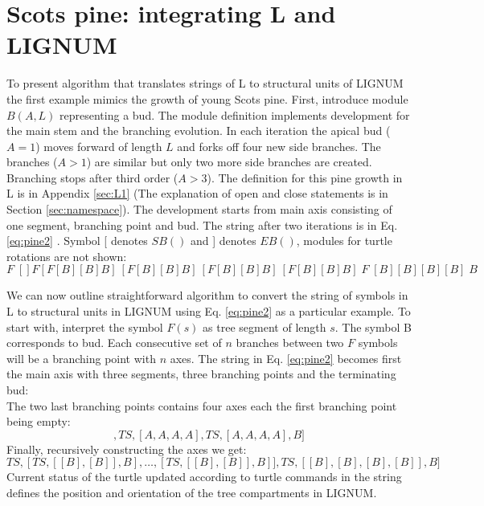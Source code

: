 \section{Scots pine: integrating L and LIGNUM}\label{sec:pine}
To present algorithm that translates  strings of L to structural units
of LIGNUM  the first  example mimics the  growth of young  Scots pine.
First,  introduce  module $B(A,L)$  representing  a  bud.  The  module
definition implements development for  the main stem and the branching
evolution.  In each  iteration the apical bud ($A  = 1$) moves forward
of length $L$ and forks off  four new side branches.  The branches ($A
> 1  $) are  similar  but only  two  more side  branches are  created.
Branching stops after third order  ($A > 3$).  The definition for this
pine growth in L is  in Appendix \ref{sec:L1} (The explanation of open
and  close   statements  is  in   Section  \ref{sec:namespace}).   The
development starts from main axis consisting of one segment, branching
point  and   bud.   The  string   after  two  iterations  is   in  Eq.
\ref{eq:pine2} . Symbol [ denotes $SB()$ and ] denotes $EB()$, modules
for turtle rotations are not shown:
\begin{equation}\label{eq:pine2}
F\;[] F [F[B][B]B]\:[F[B][B]B]\:[F[B][B]B]\:[F[B][B]B]\; F \;[B][B][B][B]\; B
\end{equation}

We can now outline straightforward  algorithm to convert the string of
symbols in L to structural units in LIGNUM using Eq. \ref{eq:pine2} as
a particular example.   To start with, interpret the  symbol $F(s)$ as
tree segment  of length $s$.  The  symbol B corresponds  to bud.  Each
consecutive  set of $n$  branches between  two $F$  symbols will  be a
branching  point with  $n$ axes.   The string  in  Eq.  \ref{eq:pine2}
becomes  first the  main  axis with  three  segments, three  branching
points and the terminating bud:
\begin{equation}
[TS, BP, TS, BP, TS, BP, B]
\end{equation}
The  two last  branching  points  contains four  axes  each the  first
branching point being empty:
\begin{equation}
[TS, [], TS, [A,A,A,A], TS, [A,A,A,A], B]
\end{equation}
Finally, recursively constructing the axes we get:
\begin{equation}
[TS, [] TS,[TS,[[B],[B]],B],\ldots, [TS,[[B],[B]],B]], TS, [[B],[B],[B],[B]], B]
\end{equation}
Current status of  the turtle updated according to  turtle commands in
the  string   defines  the  position  and  orientation   of  the  tree
compartments in LIGNUM.

